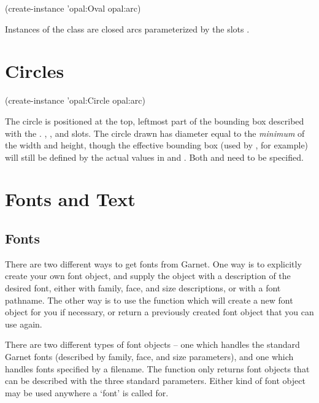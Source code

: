 \begin{programexample}


(create-instance 'opal:Oval opal:arc)
\end{programexample}

Instances of the  class are closed arcs parameterized by the slots
.



\section{Circles}

\begin{programexample}


(create-instance 'opal:Circle opal:arc)
\end{programexample}

The circle is positioned at the top, leftmost part of the bounding box
described with the . , , and  slots.
The circle drawn has diameter equal to the {\it minimum} of the width
and height, though the effective bounding box (used by
, for example) will still be defined by the actual
values in  and .  Both  and
 need to be specified.



\section{Fonts and Text}

\subsection{Fonts}
There are two different ways to get fonts from Garnet.  One way is to
explicitly create your own font object, and supply the object with a
description of the desired font, either with family, face, and size
descriptions, or with a font pathname.  The other way is to use the function
 which will create a new font object for you if
necessary, or return a previously created font object that you can use again.

There are two different types of font objects -- one which handles the
standard Garnet fonts (described by family, face, and size parameters), and
one which handles fonts specified by a filename.  The 
function only returns font objects that can be described with the three
standard parameters.  Either kind of font object may be used anywhere a
`font' is called for.

